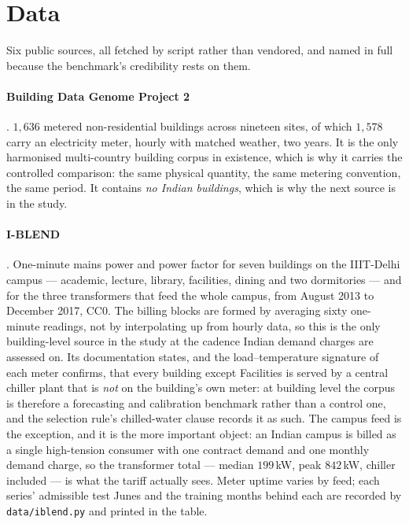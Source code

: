 \section{Data}
\label{sec:data}

Six public sources, all fetched by script rather than vendored, and named in
full because the benchmark's credibility rests on them.

\paragraph{Building Data Genome Project 2} \citep{miller2020bdg2}. $1{,}636$
metered non-residential buildings across nineteen sites, of which $1{,}578$
carry an electricity meter, hourly with matched weather, two years. It is the
only harmonised multi-country building corpus in existence, which is why it
carries the controlled comparison: the same physical quantity, the same metering
convention, the same period. It contains \emph{no Indian buildings}, which is
why the next source is in the study.

\paragraph{I-BLEND} \citep{rashid2019iblend}. One-minute mains power and power
factor for seven buildings on the IIIT-Delhi campus --- academic, lecture,
library, facilities, dining and two dormitories --- and for the three
transformers that feed the whole campus, from August 2013 to December 2017,
CC0. The billing blocks are formed by averaging sixty one-minute readings, not
by interpolating up from hourly data, so this is the only building-level
source in the study at the cadence Indian demand charges are assessed on. Its
documentation states, and the load--temperature signature of each meter
confirms, that every building except Facilities is served by a central chiller
plant that is \emph{not} on the building's own meter: at building level the
corpus is therefore a forecasting and calibration benchmark rather than a
control one, and the selection rule's chilled-water clause records it as such.
The campus feed is the exception, and it is the more important object: an
Indian campus is billed as a single high-tension consumer with one contract
demand and one monthly demand charge, so the transformer total --- median
$199$\,kW, peak $842$\,kW, chiller included --- is what the tariff actually
sees. Meter uptime varies by feed; each series' admissible test Junes and the
training months behind each are recorded by \texttt{data/iblend.py} and
printed in the table.

